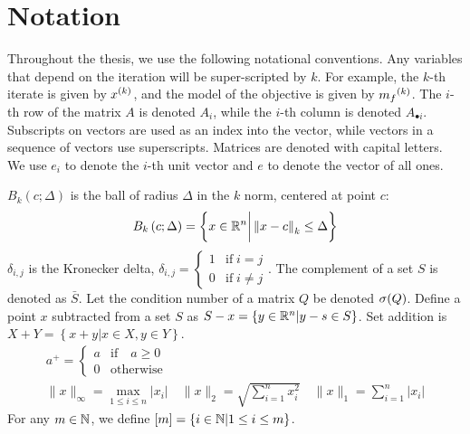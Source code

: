 \section{Notation}  Throughout the thesis, we use the following notational conventions.
Any variables that depend on the iteration will be super-scripted by $k$.
For example, the $k$-th iterate is given by $x^{(k)}$, and the model of the objective is given by ${{m}_f}^{(k)}$.
The $i$-th row of the matrix $A$ is denoted $A_i$, while the $i$-th column is denoted $A_{\bullet i}$.
Subscripts on vectors are used as an index into the vector, while vectors in a sequence of vectors use superscripts.
Matrices are denoted with capital letters.
We use $e_i$ to denote the $i$-th unit vector and $e$ to denote the vector of all ones.

$B_k\left(c; \Delta\right)$ is the ball of radius $\Delta$ in the $k$ norm, centered at point $c$:
\begin{align}
\label{define_ball}
	B_k\left(c; \Delta\right) = \left\{x \in \mathbb R^n \bigg | \left\|x - c\right\|_k \le \Delta \right\}
\end{align}
$\delta_{i,j}$ is the Kronecker delta, $\delta_{i, j} = \begin{cases} 1 & \textrm{if} \; i = j \\ 0 & \textrm{if} \; i \ne j \end{cases}$.
The complement of a set $S$ is denoted as $\bar S$.
Let the condition number of a matrix $Q$ be denoted ${\sigma}(Q)$.
Define a point $x$ subtracted from a set $S$ as $S - x = \left\{y \in \mathbb R^n | y - s \in S\right\}$.
Set addition is $X + Y = \left\{x + y | x \in X, y \in Y\right\}$.
\begin{align*}
a^+ = \begin{cases} a & \textrm{if} \quad a \ge 0 \\ 0 & \textrm{otherwise} \end{cases}\\
\|x\|_{\infty} = \max_{1\le i\le n}|x_i| \quad
\|x\|_{2} = \sqrt{\sum_{i=1}^n x_i^2} \quad
\|x\|_1 = \sum_{i = 1}^n |x_i|
\end{align*}
For any $m \in \mathbb N$, we define $[m] = \left\{i \in \mathbb N | 1 \le i \le m\right\}$.







